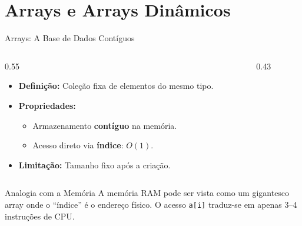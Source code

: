 \documentclass[aspectratio=169]{beamer}
\begin{document}
\section{Arrays e Arrays Dinâmicos}

\begin{frame}{Arrays: A Base de Dados Contíguos}
    \begin{columns}[T]
        \begin{column}{0.55\textwidth}
            \begin{itemize}
                \item \textbf{Definição:} Coleção fixa de elementos do mesmo tipo.
                \item \textbf{Propriedades:}
                    \begin{itemize}
                        \item Armazenamento \textbf{contíguo} na memória.
                        \item Acesso direto via \textbf{índice}: $O(1)$.
                    \end{itemize}
                \item \textbf{Limitação:} Tamanho fixo após a criação.
            \end{itemize}
        \end{column}
        \begin{column}{0.43\textwidth}
            \centering
        \end{column}
    \end{columns}

    \vspace{0.2cm}
    \begin{block}{Analogia com a Memória}
        A memória RAM pode ser vista como um gigantesco array onde o ``índice'' é o endereço físico. O acesso \texttt{a[i]} traduz-se em apenas 3--4 instruções de CPU.
    \end{block}
\end{frame}
\end{document}
